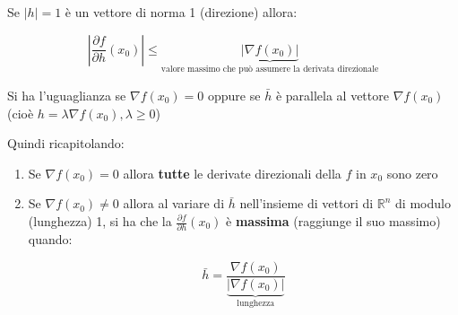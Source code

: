 \documentclass[11pt]{article}
\begin{document}
Se $|h| = 1$ è un vettore di norma 1 (direzione) allora:

\[
    |\frac{\partial f}{\partial h}(x_0) | \le \underbrace{|\nabla f(x_0) |}_\text{valore massimo che può assumere la derivata direzionale} 
\]

Si ha l'uguaglianza se $\nabla f(x_0) = 0$ oppure se $\bar{h} $ è parallela al vettore $\nabla f(x_0)$ (cioè $h = \lambda \nabla f(x_0), \lambda \ge 0$)

Quindi ricapitolando:

\begin{enumerate}
    \item Se $\nabla f(x_0) = 0$ allora \textbf{tutte} le derivate direzionali della $f$ in $x_0$ sono zero
    \item Se $\nabla f(x_0) \neq  0$ allora al variare di $\bar{h} $ nell'insieme di vettori di $\mathbb{R}^{n}$ di modulo (lunghezza) 1, si ha che la $\frac{\partial f}{\partial h}(x_0)$ è \textbf{massima} (raggiunge il suo massimo) quando:

        \[
            \bar{h} = \frac{\nabla f(x_0)}{\underbrace{|\nabla f(x_0) |}_\text{lunghezza}}
        \]
\end{enumerate}


\end{document}
